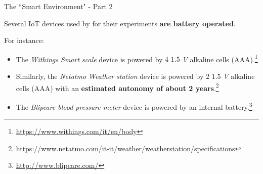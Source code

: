 \documentclass[10pt]{beamer}
\begin{document}
\begin{frame}{The ``Smart Environment" - Part 2}

\begin{block}{}
Several IoT devices used by \citet{ITPAReport} for their experiments \textbf{are battery operated}. 

For instance:

\begin{itemize}
\justifying
\item The \textit{Withings Smart scale} device is powered by $4$ $1.5$ \textit{V} alkaline cells (AAA).\footnote{\url{https://www.withings.com/it/en/body}}

\item Similarly, the \textit{Netatmo Weather station} device is powered by $2$ $1.5$ \textit{V} alkaline cells (AAA) with an \textbf{estimated autonomy of about 2 years}.\footnote{\url{https://www.netatmo.com/it-it/weather/weatherstation/specifications}
}
\item The \textit{Blipcare blood pressure meter} device is powered by an internal battery.\footnote{\url{http://www.blipcare.com/}}
\end{itemize} 

\end{block}

\end{frame} 
\end{document}
